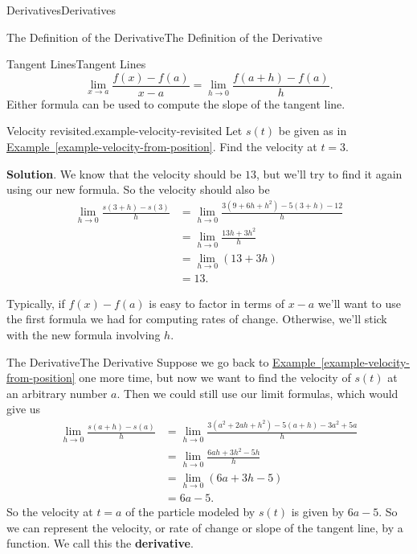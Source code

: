 \documentclass[10pt,]{book}
\newcommand{\terminology}[1]{\textbf{#1}}
\numberwithin{equation}{section}
\begin{document}
\begin{chapterptx}{Derivatives}{}{Derivatives}{}{}
\begin{sectionptx}{The Definition of the Derivative}{}{The Definition of the Derivative}{}{}
\begin{subsectionptx}{Tangent Lines}{}{Tangent Lines}{}{}
\begin{equation*}
\lim_{x\to a}\frac{f(x) - f(a)}{x-a} = \lim_{h\to0}\frac{f(a+h)-f(a)}{h}.
\end{equation*}
Either formula can be used to compute the slope of the tangent line.%
\begin{example}{Velocity revisited.}{example-velocity-revisited}%
\hypertarget{p-88}{}%
Let \(s(t)\) be given as in \hyperref[example-velocity-from-position]{Example~\ref{example-velocity-from-position}}. Find the velocity at \(t=3\).%
\par\smallskip%
\noindent\textbf{Solution}.\hypertarget{solution-19}{}\quad%
\hypertarget{p-89}{}%
We know that the velocity should be \(13\), but we'll try to find it again using our new formula. So the velocity should also be%
%
\begin{align*}
\lim_{h\to0}\frac{s(3+h)-s(3)}{h} & = \lim_{h\to0}\frac{3(9+6h+h^{2})-5(3+h)-12}{h} \\
& = \lim_{h\to0}\frac{13h+3h^{2}}{h} \\
& = \lim_{h\to0}(13+3h) \\
& = 13. 
\end{align*}
\end{example}
\hypertarget{p-90}{}%
Typically, if \(f(x)-f(a)\) is easy to factor in terms of \(x-a\) we'll want to use the first formula we had for computing rates of change. Otherwise, we'll stick with the new formula involving \(h\).%
\end{subsectionptx}
%
%
\typeout{************************************************}
\typeout{************************************************}
%
\begin{subsectionptx}{The Derivative}{}{The Derivative}{}{}\label{subsection-the-derivative}
\hypertarget{p-91}{}%
Suppose we go back to \hyperref[example-velocity-from-position]{Example~\ref{example-velocity-from-position}} one more time, but now we want to find the velocity of \(s(t)\) at an arbitrary number \(a\). Then we could still use our limit formulas, which would give us%
%
\begin{align*}
\lim_{h\to0}\frac{s(a+h)-s(a)}{h} & = \lim_{h\to0}\frac{3(a^{2}+2ah+h^{2})-5(a+h) - 3a^{2} + 5a}{h} \\
& = \lim_{h\to0}\frac{6ah+3h^{2} - 5h}{h} \\
& = \lim_{h\to0}(6a+3h-5) \\
& = 6a-5. 
\end{align*}
\hypertarget{p-92}{}%
So the velocity at \(t=a\) of the particle modeled by \(s(t)\) is given by \(6a-5\). So we can represent the velocity, or rate of change or slope of the tangent line, by a function. We call this the \terminology{derivative}.%

\end{subsectionptx}
\end{sectionptx}
\end{chapterptx}
\end{document}
